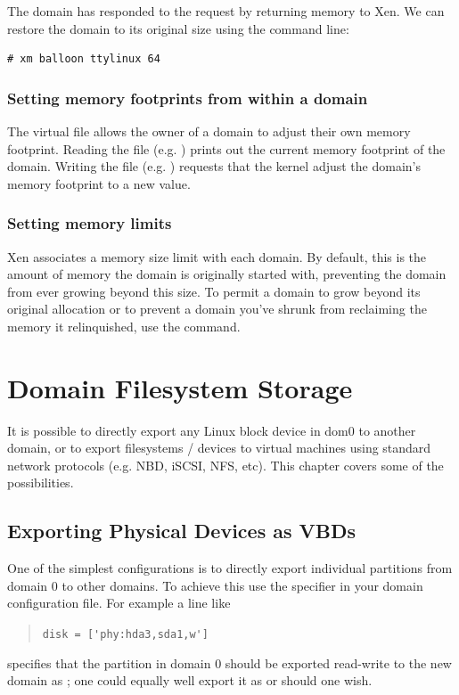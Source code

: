 \documentclass[11pt,twoside,final,openright]{report}
\begin{document}
The domain has responded to the request by returning memory to Xen. We
can restore the domain to its original size using the command line:

\begin{verbatim}
# xm balloon ttylinux 64
\end{verbatim}

\subsection{Setting memory footprints from within a domain}

The virtual file  allows the owner of a
domain to adjust their own memory footprint.  Reading the file
(e.g. ) prints out the current
memory footprint of the domain.  Writing the file
(e.g. ) requests
that the kernel adjust the domain's memory footprint to a new value.

\subsection{Setting memory limits}

Xen associates a memory size limit with each domain.  By default, this
is the amount of memory the domain is originally started with,
preventing the domain from ever growing beyond this size.  To permit a
domain to grow beyond its original allocation or to prevent a domain
you've shrunk from reclaiming the memory it relinquished, use the 
 command.

\chapter{Domain Filesystem Storage}

It is possible to directly export any Linux block device in dom0 to
another domain, or to export filesystems / devices to virtual machines
using standard network protocols (e.g. NBD, iSCSI, NFS, etc).  This
chapter covers some of the possibilities.


\section{Exporting Physical Devices as VBDs} 

One of the simplest configurations is to directly export 
individual partitions from domain 0 to other domains. To 
achieve this use the  specifier in your domain 
configuration file. For example a line like
\begin{quote}
\verb_disk = ['phy:hda3,sda1,w']_
\end{quote}
specifies that the partition  in domain 0 
should be exported read-write to the new domain as ; 
one could equally well export it as  or 
 should one wish. 
\end{document}
